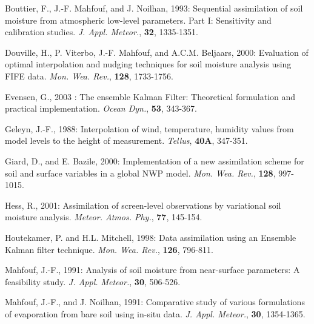 \documentclass[12pt]{article}
\begin{document}
{{{\begin{description}
\item Bouttier, F., J.-F. Mahfouf, and J. Noilhan, 1993:
Sequential assimilation of soil moisture from atmospheric low-level parameters. Part I:
Sensitivity and calibration studies. {\it J. Appl. Meteor.}, {\bf 32}, 1335-1351.



\item Douville, H., P. Viterbo, J.-F. Mahfouf, and A.C.M. Beljaars, 2000:
Evaluation of optimal interpolation and nudging techniques for soil moisture
analysis using FIFE data. {\it Mon. Wea. Rev.}, {\bf 128}, 1733-1756.

\item Evensen, G., 2003 : The ensemble Kalman Filter: Theoretical formulation
and practical implementation. {\it Ocean Dyn.}, {\bf 53}, 343-367.

\item Geleyn, J.-F., 1988: Interpolation of wind, temperature, humidity values
from model levels to the height of measurement. {\it Tellus}, {\bf 40A}, 347-351.

\item Giard, D., and E. Bazile, 2000: Implementation of a new assimilation scheme
for soil and surface variables in a global NWP model. {\it Mon. Wea. Rev.},
{\bf 128}, 997-1015.

\item Hess, R., 2001: Assimilation of screen-level observations by
  variational soil moisture analysis. {\it Meteor. Atmos. Phy.}, {\bf 77}, 145-154.

\item Houtekamer, P. and H.L. Mitchell, 1998: Data assimilation
using an Ensemble Kalman filter technique.
{\it Mon. Wea. Rev.}, {\bf 126}, 796-811.

\item Mahfouf, J.-F., 1991: Analysis of soil moisture from
  near-surface parameters: A feasibility study.
{\it J. Appl. Meteor.}, {\bf 30}, 506-526.

\item Mahfouf, J.-F., and J. Noilhan, 1991:
Comparative study of various formulations of evaporation from bare soil
using in-situ data. {\it J. Appl. Meteor.}, {\bf 30}, 1354-1365.


\end{description}}}}
\end{document}
